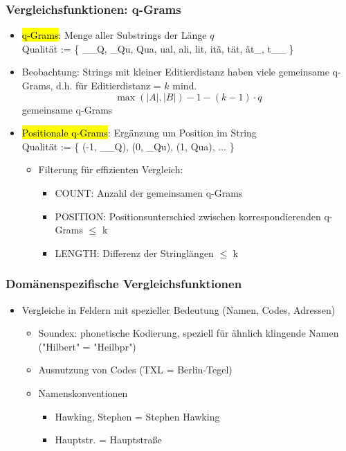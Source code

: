     
    \begin{frame}
    \frametitle{Vergleichsfunktionen: q-Grams}
    
    \begin{itemize}
    \item \hl{q-Grams}: Menge aller Substrings der Länge $q$\\
    Qualität := \{ \_\_Q, \_Qu, Qua, ual, ali, lit, itä, tät, ät\_, t\_\_ \}
    \item Beobachtung: Strings mit kleiner Editierdistanz haben viele
      gemeinsame q-Grams, d.h. für Editierdistanz = $k$ mind.
    $$\max(|A|, |B|)-1-(k-1) \cdot q$$
     gemeinsame q-Grams
    
    \item \hl{Positionale q-Grams}: Ergänzung um Position im String \\
    Qualität := \{ (-1, \_\_Q), (0, \_Qu), (1, Qua), ... \}
    \begin{itemize}
    \item Filterung für effizienten Vergleich:
    \begin{itemize}
    \item COUNT: Anzahl der gemeinsamen q-Grams
    \item POSITION: Positionsunterschied zwischen korrespondierenden
      q-Grams $\leq$ k 
    \item LENGTH: Differenz der Stringlängen $\leq$ k
    \end{itemize}
    \end{itemize}
    \end{itemize}
    
    \end{frame}
    
    
    \begin{frame}
    \frametitle{Domänenspezifische Vergleichsfunktionen}
    
    \begin{itemize}
    \item Vergleiche in Feldern mit spezieller Bedeutung (Namen, Codes,
      Adressen)
    \begin{itemize}
    \item Soundex: phonetische Kodierung, speziell für ähnlich klingende
      Namen ("Hilbert" = "Heilbpr") 
    \item Ausnutzung von Codes (TXL = Berlin-Tegel)
    \item Namenskonventionen
    \begin{itemize}
    \item Hawking, Stephen = Stephen Hawking
    \item Hauptstr. = Hauptstraße
    \end{itemize}
    \end{itemize}
    \end{itemize}
    
    \end{frame}
    
